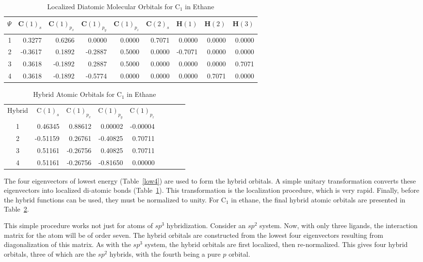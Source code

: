 \begin{table}
\caption{\label{low4l}Localized Diatomic Molecular Orbitals for C$_1$ in Ethane}
\begin{center} 
\begin{tabular}{r|rrrrrrrr} \hline
$\Psi$ &   C$(1)_s$ &C$(1)_{p_x}$ & C$(1)_{p_y}$ &  C$(1)_{p_z}$ &  
C$(2)_s$ &H$(1)$ &H$(2)$ & H$(3)$ \\
\hline
1&   0.3277& 0.6266& 0.0000& 0.0000& 0.7071& 0.0000& 0.0000& 0.0000  \\
2&  -0.3617& 0.1892&-0.2887& 0.5000& 0.0000&-0.7071& 0.0000& 0.0000  \\
3&   0.3618&-0.1892& 0.2887& 0.5000& 0.0000& 0.0000& 0.0000& 0.7071  \\
4&   0.3618&-0.1892&-0.5774& 0.0000& 0.0000& 0.0000& 0.7071& 0.0000  \\
\hline
\end{tabular}
\end{center}
\end{table}

\begin{table}
\caption{\label{c1hyb}Hybrid Atomic Orbitals for C$_1$ in Ethane}
\begin{center}  
\begin{tabular}{c|rrrrrrrr}\hline
Hybrid &   C$(1)_s$ &C$(1)_{p_x}$ & C$(1)_{p_y}$ &  C$(1)_{p_z}$  \\
1 & 0.46345 &   0.88612 &   0.00002 &  -0.00004  \\
2 &-0.51159 &   0.26761 &  -0.40825 &   0.70711  \\
3 & 0.51161 &  -0.26756 &   0.40825 &   0.70711  \\
4 & 0.51161 &  -0.26756 &  -0.81650 &   0.00000  \\
\hline
\end{tabular}
\end{center} 
\end{table}

The four eigenvectors of lowest energy (Table~\ref{low4}) are used to form the
hybrid orbitals.  A simple unitary transformation converts these eigenvectors
into localized di-atomic bonds (Table~\ref{low4l}).  This transformation is 
the localization procedure, which is very rapid. Finally, before the hybrid
functions can be used, they must be normalized to unity.  For C$_1$ in ethane,
the final hybrid atomic orbitals are presented in Table~\ref{c1hyb}.

 This simple procedure works not just for
atoms of $sp^3$ hybridization. Consider an $sp^2$ system.  Now, with only three
ligands, the interaction  matrix for the atom will be of order seven.  The
hybrid orbitals are constructed from the lowest four eigenvectors resulting
from diagonalization  of this matrix. As with the $sp^3$ system, the hybrid
orbitals are first localized, then re-normalized.  This gives four hybrid
orbitals, three of which are the $sp^2$ hybrids, with the fourth being a pure
$p$ orbital.

